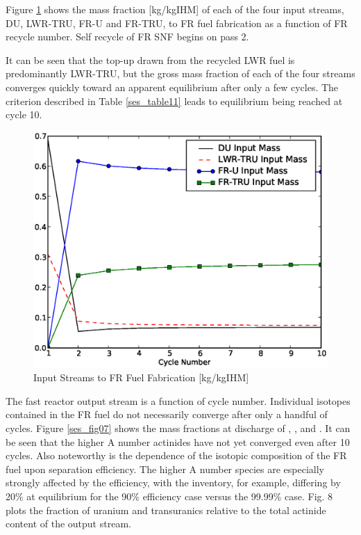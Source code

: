 Figure \ref{ses_fig06} shows the mass fraction [kg/kgIHM] of each of the four
input streams, DU, LWR-TRU, FR-U and FR-TRU, to FR fuel fabrication as a
function of FR recycle number.  Self recycle of FR SNF begins on pass 2.

It can be seen that the top-up drawn from the recycled LWR fuel is
predominantly LWR-TRU, but the gross mass fraction of each of the four
streams converges quickly toward an apparent equilibrium after only a
few cycles.  The criterion described in Table \ref{ses_table11} leads to equilibrium
being reached at cycle 10.

\begin{figure}[htbp]
\caption{Input Streams to FR Fuel Fabrication [kg/kgIHM]}
\label{ses_fig06}
\begin{center}
\includegraphics[scale=0.5]{se_sensitivity/figs/MassStreams.eps}
\end{center}
\end{figure}


The fast reactor output stream is a function of cycle number. 
Individual isotopes contained in the FR fuel do not necessarily converge
after only a handful of cycles.  Figure \ref{ses_fig07} shows the mass fractions at
discharge of , ,  and .  
It can be seen that the higher A number actinides have not yet converged even after 10 cycles. 
Also noteworthy is the dependence of the isotopic composition of the FR
fuel upon separation efficiency.  The higher A number species are
especially strongly affected by the efficiency, with the 
inventory, for example, differing by 20\% at equilibrium for the 90\%
efficiency case versus the 99.99\% case.  Fig. 8 plots the fraction of
uranium and transuranics relative to the total actinide content of the
output stream.

